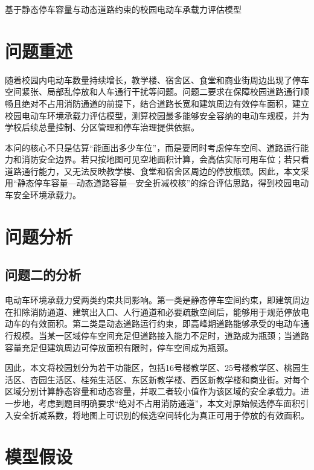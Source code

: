 \documentclass[UTF8,zihao=-4,a4paper]{ctexart}
\begin{document}
\begin{center}
{\heiti{} 基于静态停车容量与动态道路约束的校园电动车承载力评估模型}
\end{center}

\section{问题重述}

随着校园内电动车数量持续增长，教学楼、宿舍区、食堂和商业街周边出现了停车空间紧张、局部乱停放和人车通行干扰等问题。问题二要求在保障校园道路通行顺畅且绝对不占用消防通道的前提下，结合道路长宽和建筑周边有效停车面积，建立校园电动车环境承载力评估模型，测算校园最多能够安全容纳的电动车规模，并为学校后续总量控制、分区管理和停车治理提供依据。

本问的核心不只是估算“能画出多少车位”，而是要同时考虑停车空间、道路运行能力和消防安全边界。若只按地图可见空地面积计算，会高估实际可用车位；若只看道路通行能力，又无法反映教学楼、食堂和宿舍区周边的停放瓶颈。因此，本文采用“静态停车容量—动态道路容量—安全折减校核”的综合评估思路，得到校园电动车安全环境承载力。

\section{问题分析}

\subsection{问题二的分析}

电动车环境承载力受两类约束共同影响。第一类是静态停车空间约束，即建筑周边在扣除消防通道、建筑出入口、人行通道和必要疏散空间后，能够用于规范停放电动车的有效面积。第二类是动态道路运行约束，即高峰期道路能够承受的电动车通行规模。当某一区域停车空间充足但道路接入能力不足时，道路成为瓶颈；当道路容量充足但建筑周边可停放面积有限时，停车空间成为瓶颈。

因此，本文将校园划分为若干功能区，包括16号楼教学区、25号楼教学区、桃园生活区、杏园生活区、桂苑生活区、东区新教学楼、西区新教学楼和商业街。对每个区域分别计算静态容量和动态容量，并取二者较小值作为该区域的安全承载力。进一步地，考虑到题目明确要求“绝对不占用消防通道”，本文对原始候选停车面积引入安全折减系数，将地图上可识别的候选空间转化为真正可用于停放的有效面积。

\section{模型假设}
\end{document}
